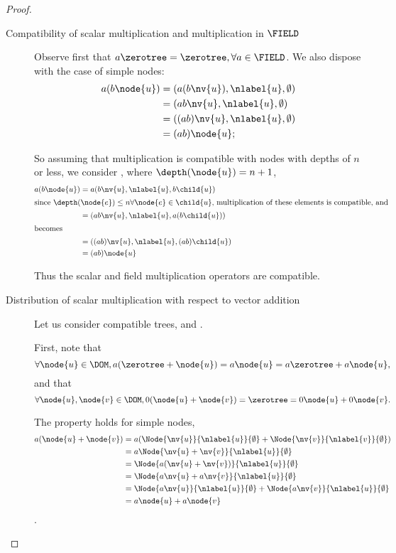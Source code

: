\begin{proposition}
\begin{proof}
\begin{description}
    \item[Compatibility of scalar multiplication and multiplication in $\FIELD$]\label{additivecompatibility}

      Observe first that \(a \zerotree = \zerotree, \forall a \in
      \FIELD\). We also dispose with the case of simple nodes:
      \begin{align*}
          a(b \node{u}) &= (a(b \nv{u}), \nlabel{u}, \emptyset) \\
          &= (a b \nv{u}, \nlabel{u}, \emptyset) \\
          &= ((a b) \nv{u}, \nlabel{u}, \emptyset) \\
          &= (a b) \node{u};
      \end{align*}

      So assuming that multiplication is compatible with nodes with
      depths of \(n\) or less, we consider , where \(\depth(\node{u})
      = n+1\),
      \begin{align*}
        a (b \node{u}) &= a (b  \nv{u}, \nlabel{u}, b\child{u}) \\
        \intertext{since \(\depth(\node{e}) \leq n \forall \node{e}\in \child{u}\), multiplication of these elements is compatible, and }
          &= (a b\/ \nv{u}, \nlabel{u}, a(b\child{u})) \\
          \intertext{becomes}
          &= ((a b) \nv{u}, \nlabel{u}, (a b)\child{u}) \\
          &= (a b) \node{u}
      \end{align*}

      Thus the scalar and field multiplication operators are compatible.

      
    \item[Distribution of scalar multiplication with respect to vector addition]\label{additivedistributivity}

      Let us consider compatible trees,  and .
      
      First, note that \[\forall \node{u} \in \DOM, a(\zerotree + \node{u}) = a \node{u} = a\zerotree + a \node{u},\]
      and that \[\forall \node{u},\node{v}\in\DOM, 0 (\node{u} + \node{v}) = \zerotree = 0 \node{u} + 0 \node{v}.\]

      The property holds for simple nodes, 
      \begin{align*}
        a(\node{u} + \node{v}) &= a (\Node{\nv{u}}{\nlabel{u}}{\emptyset} + \Node{\nv{v}}{\nlabel{v}}{\emptyset})\\ 
        &= a \Node{\nv{u} + \nv{v}}{\nlabel{u}}{\emptyset} \\
        &= \Node{a(\nv{u} + \nv{v})}{\nlabel{u}}{\emptyset} \\
        &= \Node{a\nv{u} + a\nv{v}}{\nlabel{u}}{\emptyset} \\
        &= \Node{a\nv{u}}{\nlabel{u}}{\emptyset} + \Node{a\nv{v}}{\nlabel{u}}{\emptyset} \\
        &= a \node{u} + a \node{v}
      \end{align*}.


\end{description}
\end{proof}
\end{proposition}
